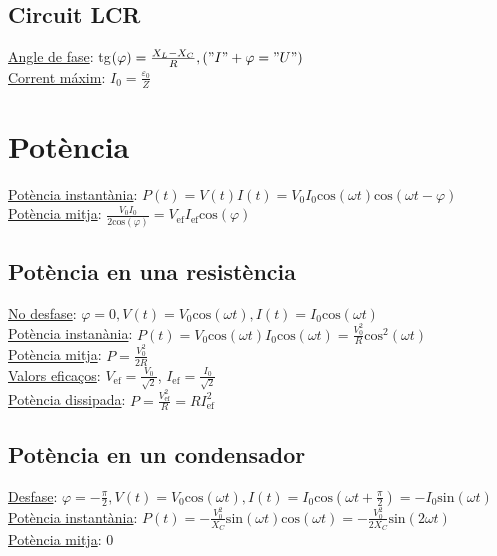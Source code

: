 \documentclass[12pt]{article}
\begin{document}
\begin{multicols}{5}
\subsection{Circuit LCR}

\underline{Angle de fase}: tg$(\varphi)=\frac{X_L-X_C}{R}, ("I" + \varphi = "U")$ \\
\underline{Corrent máxim}: $I_0 = \frac{\varepsilon_0}{Z}$

\section{Potència}

\underline{Potència instantània}: $P(t) = V(t)I(t) = V_0I_0\text{cos}(\omega t)\text{cos}(\omega t - \varphi)$ \\
\underline{Potència mitja}: $\frac{V_0I_0}{2\text{cos}(\varphi)} = V_\text{ef}I_\text{ef}\text{cos}(\varphi)$

\subsection{Potència en una resistència}

\underline{No desfase}: $\varphi = 0, V(t) = V_0\text{cos}(\omega t), I(t) = I_0\text{cos}(\omega t)$ \\
\underline{Potència instanània}: $P(t) = V_0\text{cos}(\omega t)I_0\text{cos}(\omega t) = \frac{V_0^2}{R}\text{cos}^2(\omega t)$ \\
\underline{Potència mitja}: $P = \frac{V_0^2}{2R}$ \\
\underline{Valors eficaços}: $V_{\text{ef}} = \frac{V_0}{\sqrt{2}}$, $I_{\text{ef}} = \frac{I_0}{\sqrt{2}}$ \\
\underline{Potència dissipada}: $P = \frac{V_{\text{ef}}^2}{R} = RI_{\text{ef}}^2$

\subsection{Potència en un condensador}

\underline{Desfase}: $\varphi = -\frac{\pi}{2}, V(t) = V_0\text{cos}(\omega t), I(t) = I_0\text{cos}(\omega t + \frac{\pi}{2}) = -I_0\text{sin}(\omega t)$ \\
\underline{Potència instantània}: $P(t) = -\frac{V_0^2}{X_C}\text{sin}(\omega t)\text{cos}(\omega t) = -\frac{V_0^2}{2X_C}\text{sin}(2\omega t)$ \\
\underline{Potència mitja}: 0


\end{multicols}
\end{document}
